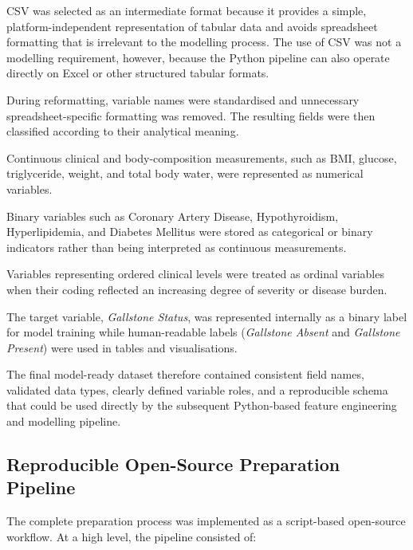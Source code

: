 CSV was selected as an intermediate format because it provides a simple,
platform-independent representation of tabular data and avoids spreadsheet
formatting that is irrelevant to the modelling process. The use of CSV was not
a modelling requirement, however, because the Python pipeline can also operate
directly on Excel or other structured tabular formats.

During reformatting, variable names were standardised and unnecessary
spreadsheet-specific formatting was removed. The resulting fields were then
classified according to their analytical meaning.

Continuous clinical and body-composition measurements, such as BMI, glucose,
triglyceride, weight, and total body water, were represented as numerical
variables.

Binary variables such as Coronary Artery Disease, Hypothyroidism,
Hyperlipidemia, and Diabetes Mellitus were stored as categorical or binary
indicators rather than being interpreted as continuous measurements.

Variables representing ordered clinical levels were treated as ordinal
variables when their coding reflected an increasing degree of severity or
disease burden.

The target variable, \textit{Gallstone Status}, was represented internally as a
binary label for model training while human-readable labels
(\textit{Gallstone Absent} and \textit{Gallstone Present}) were used in
tables and visualisations.

The final model-ready dataset therefore contained consistent field names,
validated data types, clearly defined variable roles, and a reproducible schema
that could be used directly by the subsequent Python-based feature engineering
and modelling pipeline.


\subsection{Reproducible Open-Source Preparation Pipeline}
\label{subsec:python-preparation-pipeline}

The complete preparation process was implemented as a script-based
open-source workflow. At a high level, the pipeline consisted of:

